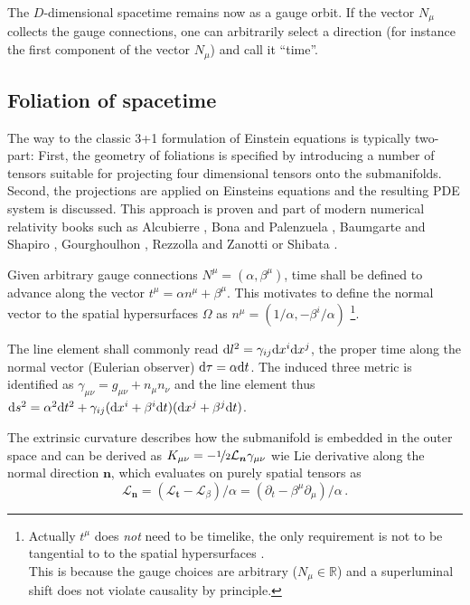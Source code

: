The $D$-dimensional spacetime remains now as a gauge orbit. If the vector 
$N_\mu$ collects the gauge connections, one can arbitrarily select a direction
(for instance the first component of the vector $N_\mu$) and call it ``time''.

\subsection{Foliation of spacetime}\label{sec:adm-foliation}
The way to the classic 3+1 formulation of Einstein equations is typically
two-part: First, the geometry of foliations is specified by introducing a
number of tensors suitable for projecting four dimensional tensors onto
the submanifolds. Second, the projections are applied on Einsteins equations
and the resulting PDE system is discussed. This approach is proven and
part of modern numerical relativity books such as Alcubierre
\cite{Alcubierre:2008}, Bona and Palenzuela \cite{Bona2009},
Baumgarte and Shapiro \cite{Baumgarte2010}, Gourghoulhon
\cite{Gourgoulhon2012}, Rezzolla and Zanotti \cite{Rezzolla_book:2013}
or Shibata \cite{Shibata_book:2016}.

Given arbitrary gauge connections $N^\mu = (\alpha, \beta^\mu)$, time shall be
defined to advance along the vector $t^\mu = \alpha n^\mu + \beta^\mu$. This
motivates to define the normal vector to the spatial hypersurfaces $\Omega$
as $n^\mu = (1/\alpha, -\beta^i/\alpha)$ \footnote{
   Actually $t^\mu$ does \emph{not} need to be timelike, the only requirement
   is not to be tangential to to the spatial hypersurfaces
   \cite{Alcubierre:2008}.
   \\
   This is because the gauge choices are 
   arbitrary ($N_\mu \in \mathbb R$) and \ie a superluminal shift does not
   violate causality by principle.
}.

The line element shall commonly read $\mathrm{d} l^2 = \gamma_{ij} \mathrm{d} x^i \mathrm{d} x^j$,
the proper time along the normal vector (Eulerian observer) $\mathrm{d} \tau = \alpha 
\mathrm{d} t$. The induced three metric is identified as 
$\gamma_{\mu\nu} = g_{\mu\nu} + n_\mu n_\nu$ and the line element
thus $\mathrm{d} s^2= \alpha^2 \mathrm{d} t^2 + \gamma_{ij} (\mathrm{d} x^i + \beta^i \mathrm{d} t)(\mathrm{d} x^j + 
\beta^j \mathrm{d} t)$.

The extrinsic curvature describes how the submanifold is embedded in the outer
space and can be derived as $K_{\mu\nu} = -\nicefrac 12 \mathcal{L}_{\boldsymbol n} 
\gamma_{\mu\nu}$ wie Lie derivative along the normal direction $\boldsymbol n$,
which evaluates on purely spatial tensors as
\begin{equation}\label{eq:lie-normal}
\mathcal L_{\boldsymbol n} = \left( \mathcal L_{\boldsymbol t} - \mathcal L_\beta \right)
/ \alpha = \left(\partial_t - \beta^\mu \partial_\mu \right)/\alpha \,.
\end{equation}


